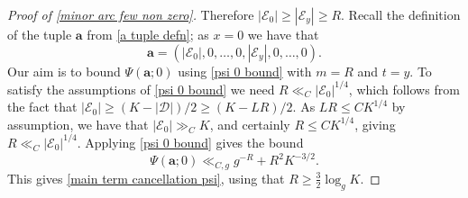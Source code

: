 \documentclass[hidelinks,11pt,reqno]{amsart}
\renewcommand{\leq}{\leqslant}
\renewcommand{\geq}{\geqslant}
\theoremstyle{remark}
\begin{document}
\begin{proof}[Proof of \cref{minor arc few non zero}]
Therefore $|\mathcal{E}_{0}|\geq |\mathcal{E}_{y}|\geq R$. Recall the definition of the tuple $\mathbf{a}$ from \cref{a tuple defn}; as $x=0$ we have that \[\mathbf{a}=(|\mathcal{E}_{0}|,0,\ldots,0,|\mathcal{E}_{y}|,0,\ldots,0 ).\] 
Our aim is to bound $\Psi(\mathbf{a};0)$ using \cref{psi 0 bound} with $m=R$ and $t=y$. To satisfy the assumptions of \cref{psi 0 bound} we need $R\ll_{C} |\mathcal{E}_{0}|^{1/4}$, which follows from the fact that $|\mathcal{E}_{0}|\geq (K-|\mathcal{D}|)/2\geq (K-LR)/2$. As $LR\leq CK^{1/4}$ by assumption, we have that $|\mathcal{E}_{0}|\gg_{C} K$, and certainly $R\leq CK^{1/4}$, giving $R\ll_{C} |\mathcal{E}_{0}|^{1/4} $. Applying \cref{psi 0 bound} gives the bound 
\begin{equation*}\label{psi cancellation}
    \Psi(\mathbf{a};0)\ll_{C,g} g^{-R}+R^{2}K^{-3/2}.
\end{equation*}
This gives \cref{main term cancellation psi}, using that $R\geq \tfrac{3}{2}\log_{g}K$.
\end{proof}
\end{document}
